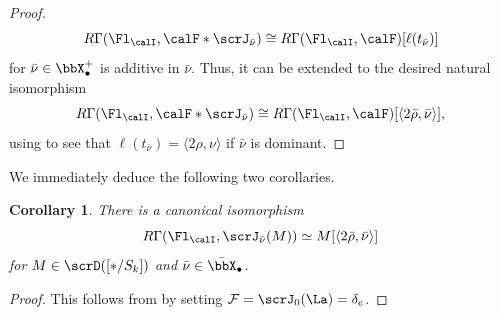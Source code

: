 \documentclass[10pt, reqno]{amsart}
\theoremstyle{plain}
\newtheorem{corollary}[theorem]{Corollary}
\theoremstyle{definition}
\numberwithin{equation}{section}
\begin{document}
\begin{proof}
		\begin{equation}
			R\Gamma(\Fl_\calI, \calF\ast\scrJ_{\bar\nu})\cong R\Gamma(\Fl_\calI, \calF)[\ell(t_{\bar\nu})]
		\end{equation}
		for $\bar\nu\in \bbX_\bullet^+$ is additive in $\bar\nu$. Thus, it can be extended to the desired natural isomorphism
		\begin{equation}
			R\Gamma(\Fl_\calI, \calF\ast\scrJ_{\bar\nu})\cong R\Gamma(\Fl_\calI, \calF)[\langle 2\bar\rho, \bar\nu\rangle],
		\end{equation}
		using \cite[Lemma 9.1.]{Zhu14} to see that $\ell(t_{\bar\nu})=\langle 2\rho, \nu\rangle$ if $\bar\nu$ is dominant.
	\end{proof}
	
	
	We immediately deduce the following two corollaries.
	
	\begin{corollary} \label{queiowuoiwuroe} There is a canonical isomorphism
		\begin{equation}
			R\Gamma(\Fl_\calI,\scrJ_{\bar{\nu}}(M))\simeq M[\langle 2\bar\rho, \bar\nu\rangle]
		\end{equation}
		for $M\in \scrD([*/S_k])$ and $\bar\nu\in \bar\bbX_\bullet$.
	\end{corollary}
	\begin{proof}
		This follows from  \Cref{owieuroieq[p[pp} by setting $\mathcal{F}=\scrJ_0(\La)=\delta_e$.
	\end{proof}
	
	
	
	
\end{document}
